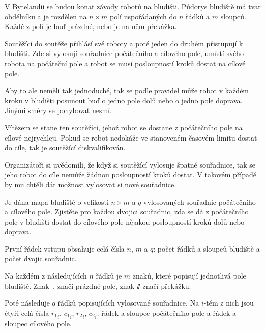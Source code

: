 
\usepackage[czech]{babel}





V Bytelandii se budou konat závody robotů na bludišti. Půdorys bludiště má tvar
obdélníku a je rozdělen na $n \times m$ polí uspořádaných do $n$ řádků a $m$
sloupců. Každé z polí je buď prázdné, nebo je na něm překážka.

Soutěžící do soutěže přihlásí své roboty a poté jeden do druhém přistupují
k bludišti. Zde si vylosují souřadnice počátečního a cílového pole, umístí svého
robota na počáteční pole a robot se musí posloupností kroků dostat na cílové
pole.

Aby to ale neměli tak jednoduché, tak se podle pravidel může robot v každém
kroku v bludišti posunout buď o jedno pole dolů nebo o jedno pole doprava.
Jinými směry se pohybovat nesmí.

Vítězem se stane ten soutěžící, jehož robot se dostane z počátečního pole na
cílové nejrychleji. Pokud se robot nedokáže ve stanoveném časovém limitu dostat
do cíle, tak je soutěžící diskvalifikován.

Organizátoři si uvědomili, že když si soutěžící vylosuje špatné souřadnice, tak
se jeho robot do cíle nemůže žádnou posloupností kroků dostat. V takovém případě
by mu chtěli dát možnost vylosovat si nové souřadnice.


Je dána mapa bludiště o velikosti $n \times m$ a $q$ vylosovaných souřadnic
počátečního a cílového pole. Zjistěte pro každou dvojici souřadnic, zda se dá
z počátečního pole v bludišti dostat do cílového pole nějakou posloupností kroků
dolů nebo doprava.


První řádek vstupu obsahuje celá čísla $n$, $m$ a $q$: počet řádků a sloupců
bludiště a počet dvojic souřadnic.

Na každém z následujících $n$ řádků je $m$ znaků, které popisují jednotlivá pole
bludiště. Znak \texttt{.} značí prázdné pole, znak \texttt{\#} značí překážku.

Poté následuje $q$ řádků popisujících vylosované souřadnice. Na $i$-tém z nich
jsou čtyři celá čísla ${r_1}_i$, ${c_1}_i$, ${r_2}_i$, ${c_2}_i$: řádek a
sloupec počátečního pole a řádek a sloupec cílového pole.

